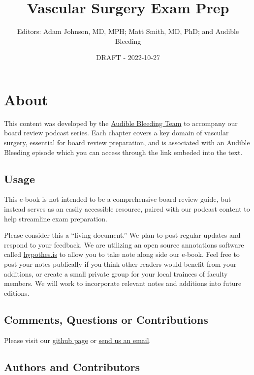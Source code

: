 \documentclass[
]{book}
\title{Vascular Surgery Exam Prep}
\author{Editors: Adam Johnson, MD, MPH; Matt Smith, MD, PhD; and Audible Bleeding}
\date{DRAFT - 2022-10-27}
\begin{document}
\maketitle

{
\setcounter{tocdepth}{1}
\tableofcontents
}
\hypertarget{about}{%
\chapter{About}\label{about}}

This content was developed by the \href{https://www.audiblebleeding.com/about-1/}{Audible Bleeding Team} to accompany our board review podcast series. Each chapter covers a key domain of vascular surgery, essential for board review preparation, and is associated with an Audible Bleeding episode which you can access through the link embeded into the text.

\hypertarget{usage}{%
\section{Usage}\label{usage}}

This e-book is not intended to be a comprehensive board review guide, but instead serves as an easily accessible resource, paired with our podcast content to help streamline exam preparation.

Please consider this a ``living document.'' We plan to post regular updates and respond to your feedback. We are utilizing an open source annotations software called \href{https://web.hypothes.is}{hypothes.is} to allow you to take note along side our e-book. Feel free to post your notes publically if you think other readers would benefit from your additions, or create a small private group for your local trainees of faculty members. We will work to incorporate relevant notes and additions into future editions.

\hypertarget{comments-questions-or-contributions}{%
\section{Comments, Questions or Contributions}\label{comments-questions-or-contributions}}

Please visit our \href{https://github.com/adam-mdmph/VS-Exam-Prep}{github page} or \href{mailto:audiblebleeding@vascularsociety.org}{send us an email}.

\hypertarget{authors-and-contributors}{%
\section{Authors and Contributors}\label{authors-and-contributors}}
\end{document}
